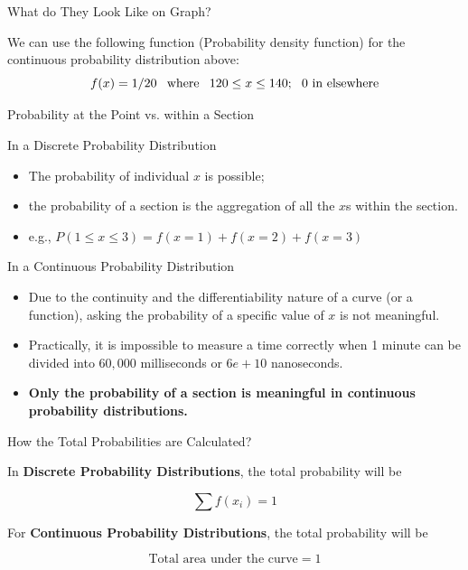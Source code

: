 \documentclass{beamer}
\begin{document}
\begin{frame}{What do They Look Like on Graph?}
\begin{multicols}{2}
\begin{scriptsize}
\begin{center}
\end{center}\end{scriptsize}

\end{multicols}

We can use the following function (Probability density function) for the continuous probability distribution above: 
$$f(x) = 1/20 \text{ \hspace{0.05cm} where \hspace{0.05cm} } 120 \leq x \leq 140 \text{; \hspace{0.05cm} 0 in elsewhere}$$

\end{frame}


\begin{frame}{Probability at the Point vs. within a Section}

In a Discrete Probability Distribution 
\begin{itemize}
\item The probability of individual $x$ is possible;
\item the probability of a section is the aggregation of all the $x$s within the section.
\item e.g., $P(1 \leq x \leq 3) = f(x=1) + f(x=2) + f(x=3)$ 

\end{itemize}

In a Continuous Probability Distribution

\begin{itemize}
\item Due to the continuity and the differentiability nature of a curve (or a function), asking the probability of a specific value of $x$ is not meaningful.
\item Practically, it is impossible to measure a time correctly when 1 minute can be divided into $60,000$ milliseconds or $6e+10$ nanoseconds.

\item \textbf{Only the probability of a section is meaningful in continuous probability distributions.} 

\end{itemize}

\end{frame}



\begin{frame}{How the Total Probabilities are Calculated?}

In \textbf{Discrete Probability Distributions}, the total probability will be 

$$\sum f(x_i) = 1$$

\vspace{0.3 cm}

For \textbf{Continuous Probability Distributions}, the total probability will be 

$$\text{Total area under the curve} = 1$$

\end{frame}
\end{document}
